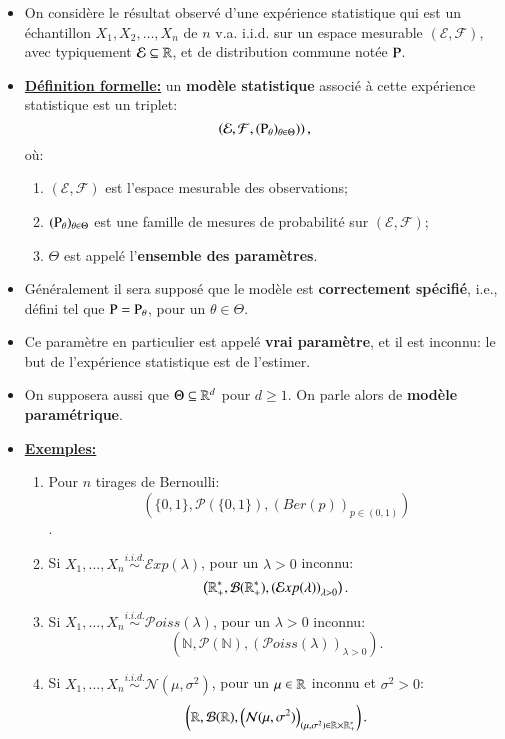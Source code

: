 \begin{frame}[allowframebreaks]{\sectionpage}
\begin{itemize}
    \item On considère le résultat observé d'une expérience statistique  
     qui est un échantillon $X_1, X_2,\ldots, X_n$ de $n$ v.a. i.i.d. sur un espace mesurable 
     $(\mathcal{E}, \mathcal{F})$, avec typiquement $\mathcal{E}\subseteq \mathbb{R}$, 
     et de distribution commune notée $\operatorname{P}$.
    \item \textbf{\underline{Définition formelle:}} un \textbf{modèle statistique} associé à cette expérience statistique est un triplet: 
    \[\left(\mathcal{E}, \mathcal{F}, (\operatorname{P}_\theta)_{\theta\in\Theta})\right),
        \] où: \begin{enumerate}[-]
            \item $\left(\mathcal{E}, \mathcal{F}\right)$ est l'espace mesurable des observations;
            \item $(\operatorname{P}_\theta)_{\theta\in\Theta}$ est une famille de mesures de probabilité
            sur $\left(\mathcal{E}, \mathcal{F}\right)$;
            \item $\Theta$ est appelé l'\textbf{ensemble des paramètres}.
        \end{enumerate}
\framebreak
\item Généralement il sera supposé que le modèle est \textbf{correctement spécifié}, i.e., 
défini tel que $\operatorname{P} = \operatorname{P}_\theta$, pour un $\theta \in \Theta$.
\item Ce paramètre en particulier est appelé \textbf{vrai paramètre}, et il est inconnu: 
le but de l'expérience statistique est de l'estimer.
\item On supposera aussi que $\Theta \subseteq \mathbb{R}^d$ pour $d\geq 1$. On parle alors de \textbf{modèle
paramétrique}.
\framebreak
\item \textbf{\underline{Exemples:}}\begin{enumerate}
    \item Pour $n$ tirages de Bernoulli: \[
        \left(\{0, 1\}, \mathcal{P}(\{0, 1\}), \left(Ber(p)\right)_{p\in(0,1)}\right)\].
    \item Si $X_1, \ldots, X_n\overset{i.i.d.}{\sim}\mathcal{E}xp(\lambda)$, pour un $\lambda>0$ 
    inconnu: \[
        \left(\mathbb{R}_{+}^{*}, \mathcal{B}(\mathbb{R}_{+}^{*}), 
        \left(\mathcal{E}xp(\lambda)\right)_{\lambda>0}\right).\]
    \item Si $X_1, \ldots, X_n\overset{i.i.d.}{\sim} \mathcal{P}oiss(\lambda)$, pour un $\lambda>0$ 
    inconnu: \[
        \left(\mathbb{N}, \mathcal{P}(\mathbb{N}), 
        \left(\mathcal{P}oiss(\lambda)\right)_{\lambda>0}\right).\]
    \item Si $X_1, \ldots, X_n\overset{i.i.d.}{\sim}\mathcal{N}(\mu, \sigma^2)$, pour un $\mu\in\mathbb{R}$ 
    inconnu et $\sigma^2>0$: \[
        \left(\mathbb{R}, \mathcal{B}(\mathbb{R}), \left(\mathcal{N}(\mu, \sigma^2) 
        \right)_{(\mu, \sigma^2)\in \mathbb{R} \times \mathbb{R}_+^*}
        \right).\]
\end{enumerate}
\end{itemize}
\end{frame}
 
